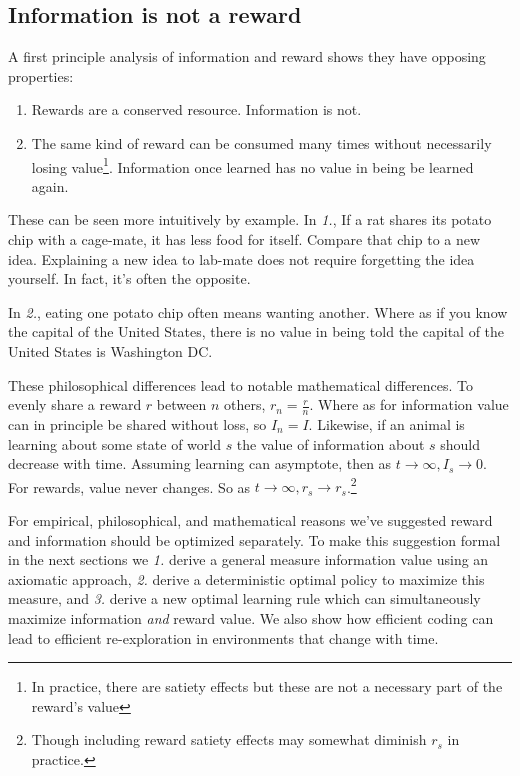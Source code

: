 \documentclass[9pt,twocolumn,twoside]{pnas-new}
\begin{document}
\subsection*{Information is not a reward}
A first principle analysis of information and reward shows they have opposing properties:

\begin{enumerate}
    \item Rewards are a conserved resource. Information is not. 
    \item The same kind of reward can be consumed many times without necessarily losing value\footnote{In practice, there are satiety effects but these are not a necessary part of the reward's value}. Information once learned has no value in being be learned again.
\end{enumerate}

These can be seen more intuitively by example. In \textit{1.}, If a rat shares its potato chip with a cage-mate, it has less food for itself. Compare that chip to a new idea. Explaining a new idea to lab-mate does not require forgetting the idea yourself. In fact, it's often the opposite.

In \textit{2.}, eating one potato chip often means wanting another. Where as if you know the capital of the United States, there is no value in being told the capital of the United States is Washington DC.

These philosophical differences lead to notable mathematical differences. To evenly share a reward $r$ between $n$ others, $r_n = \frac{r}{n}$. Where as for information value can in principle be shared without loss, so $I_n = I$. Likewise, if an animal is learning about some state of world $s$ the value of information about $s$ should decrease with time. Assuming learning can asymptote, then as $t \rightarrow \infty, I_s \rightarrow 0$. For rewards, value never changes. So as $t \rightarrow \infty, r_s \rightarrow r_s$.\footnote{Though including reward satiety effects may somewhat diminish $r_s$ in practice.}

For empirical, philosophical, and mathematical reasons we've suggested reward and information should be optimized separately. To make this suggestion formal in the next sections we \textit{1.} derive a general measure information value using an axiomatic approach, \textit{2.} derive a deterministic optimal policy to maximize this measure, and \textit{3.} derive a new optimal learning rule which can simultaneously maximize information \textit{and} reward value. We also show how efficient coding can lead to efficient re-exploration in environments that change with time. 
\end{document}
